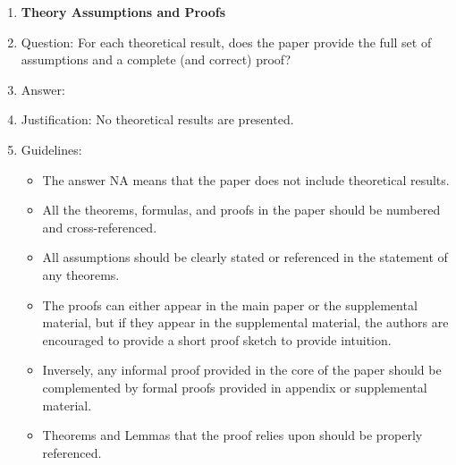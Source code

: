 \documentclass{article}
\begin{document}
\begin{enumerate}
\item {\bf Theory Assumptions and Proofs}
    \item[] Question: For each theoretical result, does the paper provide the full set of assumptions and a complete (and correct) proof?
    \item[] Answer: \answerNA{} %
    \item[] Justification: No theoretical results are presented. 
    \item[] Guidelines:
    \begin{itemize}
        \item The answer NA means that the paper does not include theoretical results. 
        \item All the theorems, formulas, and proofs in the paper should be numbered and cross-referenced.
        \item All assumptions should be clearly stated or referenced in the statement of any theorems.
        \item The proofs can either appear in the main paper or the supplemental material, but if they appear in the supplemental material, the authors are encouraged to provide a short proof sketch to provide intuition. 
        \item Inversely, any informal proof provided in the core of the paper should be complemented by formal proofs provided in appendix or supplemental material.
        \item Theorems and Lemmas that the proof relies upon should be properly referenced. 
    \end{itemize}


\end{enumerate}
\end{document}
